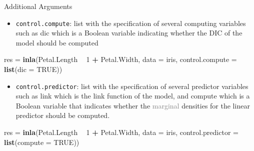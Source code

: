 \documentclass[9pt,ignorenonframetext,]{beamer}
\newenvironment{Shaded}{\begin{snugshade}}{\end{snugshade}}
\newcommand{\DataTypeTok}[1]{\textcolor[rgb]{0.13,0.29,0.53}{#1}}
\newcommand{\DecValTok}[1]{\textcolor[rgb]{0.00,0.00,0.81}{#1}}
\newcommand{\KeywordTok}[1]{\textcolor[rgb]{0.13,0.29,0.53}{\textbf{#1}}}
\newcommand{\NormalTok}[1]{#1}
\newcommand{\OperatorTok}[1]{\textcolor[rgb]{0.81,0.36,0.00}{\textbf{#1}}}
\newcommand{\OtherTok}[1]{\textcolor[rgb]{0.56,0.35,0.01}{#1}}
\newcommand{\StringTok}[1]{\textcolor[rgb]{0.31,0.60,0.02}{#1}}
\providecommand{\tightlist}{%
  \setlength{\itemsep}{0pt}\setlength{\parskip}{0pt}}
\begin{document}
\begin{frame}[fragile]{Additional Arguments}
\protect\hypertarget{additional-arguments}{}

\begin{itemize}
\tightlist
\item
  \texttt{control.compute}: list with the specification of several
  computing variables such as dic which is a Boolean variable indicating
  whether the DIC of the model should be computed
\end{itemize}

\begin{Shaded}
\begin{Highlighting}[]
\NormalTok{res =}\StringTok{ }\KeywordTok{inla}\NormalTok{(Petal.Length }\OperatorTok{~}\StringTok{ }\DecValTok{1} \OperatorTok{+}\StringTok{ }\NormalTok{Petal.Width, }\DataTypeTok{data =}\NormalTok{ iris,}
            \DataTypeTok{control.compute =} \KeywordTok{list}\NormalTok{(}\DataTypeTok{dic =} \OtherTok{TRUE}\NormalTok{))}
\end{Highlighting}
\end{Shaded}

\begin{itemize}
\tightlist
\item
  \texttt{control.predictor}: list with the specification of several
  predictor variables such as link which is the link function of the
  model, and compute which is a Boolean variable that indicates whether
  the \textcolor<2>{gray}{marginal} densities for the linear predictor
  should be computed.
\end{itemize}

\begin{Shaded}
\begin{Highlighting}[]
\NormalTok{res =}\StringTok{ }\KeywordTok{inla}\NormalTok{(Petal.Length }\OperatorTok{~}\StringTok{ }\DecValTok{1} \OperatorTok{+}\StringTok{ }\NormalTok{Petal.Width, }\DataTypeTok{data =}\NormalTok{ iris,}
           \DataTypeTok{control.predictor =} \KeywordTok{list}\NormalTok{(}\DataTypeTok{compute =} \OtherTok{TRUE}\NormalTok{))}
\end{Highlighting}
\end{Shaded}

\pause

\end{frame}
\end{document}
